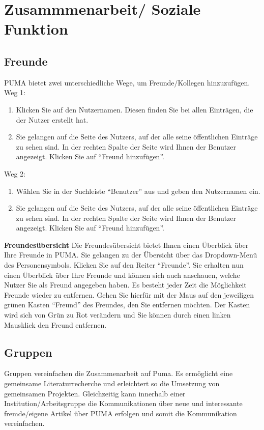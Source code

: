 \documentclass[a4paper,11pt,twoside]{scrbook}
\begin{document}
\newpage
\section{Zusammmenarbeit/ Soziale Funktion}
\subsection{Freunde}%
PUMA bietet zwei unterschiedliche Wege, um Freunde/Kollegen hinzuzufügen.
\newline
Weg 1:
\begin{enumerate}
    \item Klicken Sie auf den Nutzernamen. Diesen finden Sie bei allen Einträgen, die der Nutzer erstellt hat.
    \item Sie gelangen auf die Seite des Nutzers, auf der alle seine öffentlichen Einträge zu sehen sind. In der rechten Spalte der Seite wird Ihnen der Benutzer angezeigt. Klicken Sie auf \enquote{Freund hinzufügen}.
\end{enumerate}
Weg 2:
\begin{enumerate}
    \item Wählen Sie in der Suchleiste \enquote{Benutzer} aus und geben den Nutzernamen ein.
    \item Sie gelangen auf die Seite des Nutzers, auf der alle seine öffentlichen Einträge zu sehen sind. In der rechten Spalte der Seite wird Ihnen der Benutzer angezeigt. Klicken Sie auf \enquote{Freund hinzufügen}.
\end{enumerate}
\textbf{Freundesübersicht} \newline
Die Freundesübersicht bietet Ihnen einen Überblick über Ihre Freunde in PUMA. Sie gelangen zu der Übersicht über das Dropdown-Menü des Personensymbols. Klicken Sie auf den Reiter \enquote{Freunde}. Sie erhalten nun einen Überblick über Ihre Freunde und können sich auch anschauen, welche Nutzer Sie als Freund angegeben haben. \newline
Es besteht jeder Zeit die Möglichkeit Freunde wieder zu entfernen. Gehen Sie hierfür mit der Maus auf den jeweiligen grünen Kasten \enquote{Freund} des Freundes, den Sie entfernen möchten. Der Kasten wird sich von Grün zu Rot verändern und Sie können durch einen linken Mausklick den Freund entfernen. 
\subsection{Gruppen}
Gruppen vereinfachen die Zusammenarbeit auf Puma. Es ermöglicht eine gemeinsame Literaturrecherche und erleichtert so die Umsetzung von gemeinsamen Projekten. Gleichzeitig kann innerhalb einer Institution/Arbeitsgruppe die Kommunikationen über neue und interessante fremde/eigene Artikel über PUMA erfolgen und somit die Kommunikation vereinfachen. 
\end{document}
